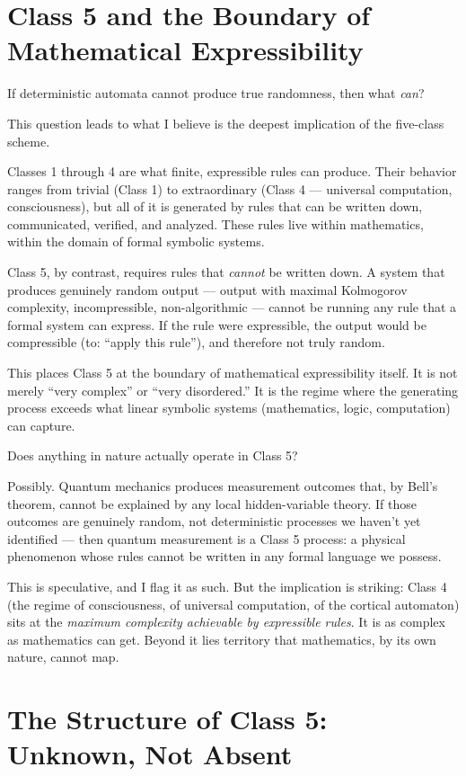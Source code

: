 \documentclass[11pt, twoside, openright]{book}
\begin{document}
\section*{Class 5 and the Boundary of Mathematical Expressibility}

If deterministic automata cannot produce true randomness, then what \textit{can}?

This question leads to what I believe is the deepest implication of the five-class scheme.

Classes 1 through 4 are what finite, expressible rules can produce. Their behavior ranges from trivial (Class 1) to extraordinary (Class 4 --- universal computation, consciousness), but all of it is generated by rules that can be written down, communicated, verified, and analyzed. These rules live within mathematics, within the domain of formal symbolic systems.

Class 5, by contrast, requires rules that \textit{cannot} be written down. A system that produces genuinely random output --- output with maximal Kolmogorov complexity, incompressible, non-algorithmic --- cannot be running any rule that a formal system can express. If the rule were expressible, the output would be compressible (to: ``apply this rule''), and therefore not truly random.

This places Class 5 at the boundary of mathematical expressibility itself. It is not merely ``very complex'' or ``very disordered.'' It is the regime where the generating process exceeds what linear symbolic systems (mathematics, logic, computation) can capture.

Does anything in nature actually operate in Class 5?

Possibly. Quantum mechanics produces measurement outcomes that, by Bell's theorem, cannot be explained by any local hidden-variable theory. If those outcomes are genuinely random, not deterministic processes we haven't yet identified --- then quantum measurement is a Class 5 process: a physical phenomenon whose rules cannot be written in any formal language we possess.

This is speculative, and I flag it as such. But the implication is striking: Class 4 (the regime of consciousness, of universal computation, of the cortical automaton) sits at the \textit{maximum complexity achievable by expressible rules}. It is as complex as mathematics can get. Beyond it lies territory that mathematics, by its own nature, cannot map.

\section*{The Structure of Class 5: Unknown, Not Absent}
\end{document}

